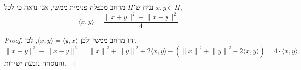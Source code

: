 \subquestion{}
נניח ש־$H$ מרחב מכפלה פנימית ממשי, אנו נראה כי לכל $x, y \in H$,
\[
	\langle x, y \rangle
	= \frac{\lVert x + y \rVert^2 - \lVert x - y \rVert^2}{4}
\]
\begin{proof}
	זהו מרחב ממשי ולכן $\langle x, y \rangle = \langle y, x \rangle$, לכן,
	\[
		\lVert x + y \rVert^2 - \lVert x - y \rVert^2
		= {\lVert x \rVert}^2 + {\lVert y \rVert}^2 + 2 \langle x, y \rangle
		- ({\lVert x \rVert}^2 + {\lVert y \rVert}^2 - 2 \langle x, y \rangle)
		= 4 \cdot \langle x, y \rangle
	\]
	והנוסחה נובעת ישירות.
\end{proof}


